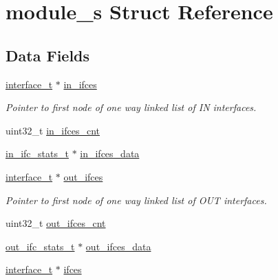 \hypertarget{structmodule__s}{}\section{module\+\_\+s Struct Reference}
\label{structmodule__s}
\subsection*{Data Fields}
\begin{DoxyCompactItemize}
\item 
\mbox{\label{structmodule__s_acd6b7f4b171fba70260b1d959460e3e5}} 
\hyperlink{structinterface__s}{interface\+\_\+t} $\ast$ \hyperlink{structmodule__s_acd6b7f4b171fba70260b1d959460e3e5}{in\+\_\+ifces}
\begin{DoxyCompactList}\small\item\em Pointer to first node of one way linked list of IN interfaces. \end{DoxyCompactList}\item 
uint32\+\_\+t \hyperlink{structmodule__s_a11996e033ac044b49c3c84f5fa08e3ca}{in\+\_\+ifces\+\_\+cnt}
\item 
\hyperlink{structin__ifc__stats__s}{in\+\_\+ifc\+\_\+stats\+\_\+t} $\ast$ \hyperlink{structmodule__s_ab7b316923905c3beaae1a0c82665d00a}{in\+\_\+ifces\+\_\+data}
\item 
\mbox{\label{structmodule__s_ab2cfa1956737f9983faeb3d8df063908}} 
\hyperlink{structinterface__s}{interface\+\_\+t} $\ast$ \hyperlink{structmodule__s_ab2cfa1956737f9983faeb3d8df063908}{out\+\_\+ifces}
\begin{DoxyCompactList}\small\item\em Pointer to first node of one way linked list of O\+UT interfaces. \end{DoxyCompactList}\item 
uint32\+\_\+t \hyperlink{structmodule__s_a1a4b91fbbd772cb721dd5c14192bcb9b}{out\+\_\+ifces\+\_\+cnt}
\item 
\hyperlink{structout__ifc__stats__s}{out\+\_\+ifc\+\_\+stats\+\_\+t} $\ast$ \hyperlink{structmodule__s_a02c5e701e13b276b4c04de96b9e1da1c}{out\+\_\+ifces\+\_\+data}
\item 
\hyperlink{structinterface__s}{interface\+\_\+t} $\ast$ \hyperlink{structmodule__s_a1d4a2637c595e49efd1670ca20d9b98d}{ifces}
\item 
\mbox{\label{structmodule__s_a4648ca5376f14c3b1a0aaae2f8ad09eb}} 

\end{DoxyCompactItemize}
